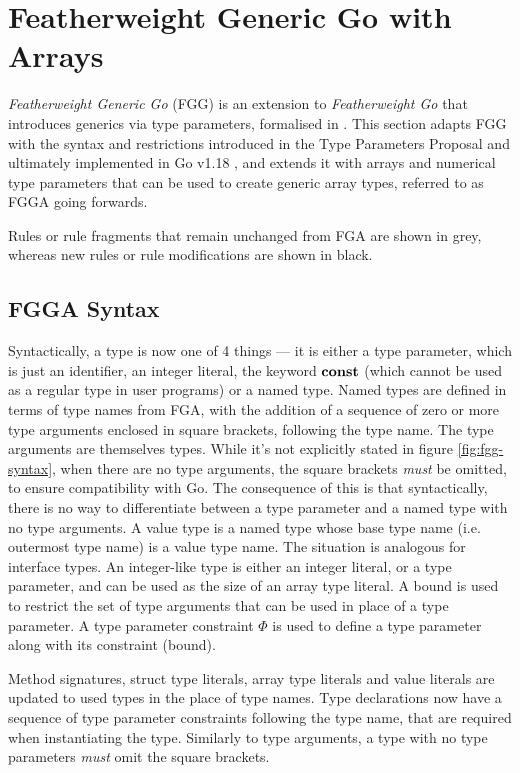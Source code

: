 \section{Featherweight Generic Go with Arrays}
\label{ch:fgg}

\emph{Featherweight Generic Go} (FGG) is an extension to \emph{Featherweight Go}
that introduces generics via type parameters, formalised in \autocite{fg}. This
section adapts FGG with the syntax and restrictions introduced in the Type
Parameters Proposal and ultimately implemented in Go v1.18
\autocite{genericsProposal}, and extends it with arrays and numerical type
parameters that can be used to create generic array types, referred to as FGGA
going forwards.

Rules or rule fragments that remain unchanged from FGA are shown in grey,
whereas new rules or rule modifications are shown in black.

\subsection{FGGA Syntax}
\label{sec:fgg-syntax}

Syntactically, a type is now one of 4 things --- it is either a type parameter,
which is just an identifier, an integer literal, the keyword $\texttt{\bf const}$ (which
cannot be used as a regular type in user programs) or a named type. Named types
are defined in terms of type names from FGA, with the addition of a sequence of
zero or more type arguments enclosed in square brackets, following the type
name. The type arguments are themselves types. While it's not explicitly stated
in figure \ref{fig:fgg-syntax}, when there are no type arguments, the square
brackets \emph{must} be omitted, to ensure compatibility with Go. The
consequence of this is that syntactically, there is no way to differentiate
between a type parameter and a named type with no type arguments. A value type
is a named type whose base type name (i.e. outermost type name) is a value type
name. The situation is analogous for interface types. An integer-like type is
either an integer literal, or a type parameter, and can be used as the size of
an array type literal. A bound is used to restrict the set of type arguments
that can be used in place of a type parameter. A type parameter constraint
$\Phi$ is used to define a type parameter along with its constraint (bound).

Method signatures, struct type literals, array type literals and value literals
are updated to used types in the place of type names. Type declarations now have
a sequence of type parameter constraints following the type name, that are
required when instantiating the type. Similarly to type arguments, a type with
no type parameters \emph{must} omit the square brackets.

